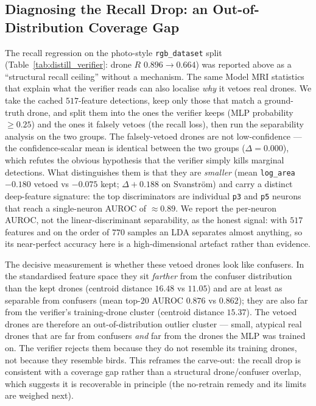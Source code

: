 \documentclass[12pt,a4paper,oneside,openright]{book}
\begin{document}
\subsection{Diagnosing the Recall Drop: an Out-of-Distribution Coverage Gap}
\label{sec:mlp_recall_drop}

The recall regression on the photo-style \texttt{rgb\_dataset} split (Table~\ref{tab:distill_verifier}: drone $R$ $0.896\to0.664$) was reported above as a ``structural recall ceiling'' without a mechanism. The same Model MRI statistics that explain what the verifier reads can also localise \emph{why} it vetoes real drones. We take the cached $517$-feature detections, keep only those that match a ground-truth drone, and split them into the ones the verifier keeps (MLP probability $\geq 0.25$) and the ones it falsely vetoes (the recall loss), then run the separability analysis on the two groups. The falsely-vetoed drones are not low-confidence --- the confidence-scalar mean is identical between the two groups ($\Delta=0.000$), which refutes the obvious hypothesis that the verifier simply kills marginal detections. What distinguishes them is that they are \emph{smaller} (mean \texttt{log\_area} $-0.180$ vetoed vs $-0.075$ kept; $\Delta+0.188$ on Svanstr\"om) and carry a distinct deep-feature signature: the top discriminators are individual \texttt{p3} and \texttt{p5} neurons that reach a single-neuron AUROC of $\approx 0.89$. We report the per-neuron AUROC, not the linear-discriminant separability, as the honest signal: with $517$ features and on the order of $770$ samples an LDA separates almost anything, so its near-perfect accuracy here is a high-dimensional artefact rather than evidence.

The decisive measurement is whether these vetoed drones look like confusers. In the standardised feature space they sit \emph{farther} from the confuser distribution than the kept drones (centroid distance $16.48$ vs $11.05$) and are at least as separable from confusers (mean top-$20$ AUROC $0.876$ vs $0.862$); they are also far from the verifier's training-drone cluster (centroid distance $15.37$). The vetoed drones are therefore an out-of-distribution outlier cluster --- small, atypical real drones that are far from confusers \emph{and} far from the drones the MLP was trained on. The verifier rejects them because they do not resemble its training drones, not because they resemble birds. This reframes the carve-out: the recall drop is consistent with a coverage gap rather than a structural drone/confuser overlap, which suggests it is recoverable in principle (the no-retrain remedy and its limits are weighed next).
\end{document}
